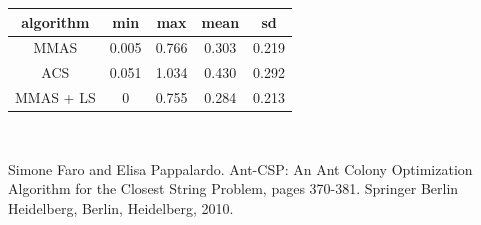 \documentclass{article}
\begin{document}
\begin{tabular}{c|c|c|c|c}
    algorithm & min & max & mean & sd \\
    \hline
    MMAS & 0.005 & 0.766 & 0.303 & 0.219 \\
    ACS & 0.051 & 1.034 & 0.430  & 0.292 \\
    MMAS + LS & 0 & 0.755 & 0.284 & 0.213
\end{tabular}\\

\begin{thebibliography}{2}

 Simone Faro and Elisa Pappalardo.
Ant-CSP: An Ant Colony Optimization Algorithm for the Closest String Problem, pages 370-381.
Springer Berlin
Heidelberg, Berlin, Heidelberg, 2010.

\end{thebibliography}
\end{document}
